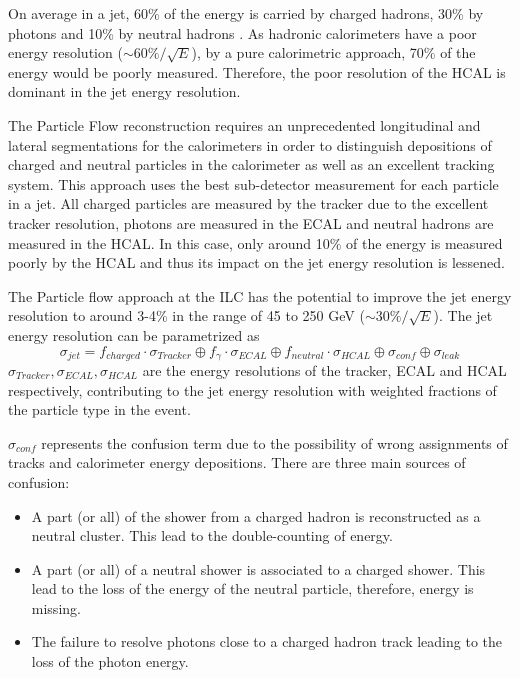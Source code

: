 On average in a jet, 60\% of the energy is carried by charged hadrons, 30\% by photons and 10\% by neutral hadrons \cite{Ebrahimi:394104}. As hadronic calorimeters have a poor energy resolution ($\sim 60\%/\sqrt{E}$), by a pure calorimetric approach, 70\% of the energy would be poorly measured. Therefore, the poor resolution of the HCAL is dominant in the jet energy resolution.

The Particle Flow reconstruction requires an unprecedented longitudinal and lateral segmentations for the calorimeters in order to distinguish depositions of charged and neutral particles in the calorimeter as well as an excellent tracking system. This approach uses the best sub-detector measurement for each particle in a jet. All charged particles are measured by the tracker due to the excellent tracker resolution, photons are measured in the ECAL and neutral hadrons are measured in the HCAL. In this case, only around 10\% of the energy is measured poorly by the HCAL and thus its impact on the jet energy resolution is lessened.

The Particle flow approach at the ILC has the potential to improve the jet energy resolution to around 3-4\% in the range of 45 to 250 GeV ($\sim 30\%/\sqrt{E}$). The jet energy resolution can be parametrized as
\begin{equation}
  \sigma_{jet} = f_{charged} \cdot \sigma_{Tracker} \oplus f_{\gamma} \cdot \sigma_{ECAL} \oplus f_{neutral} \cdot \sigma_{HCAL} \oplus \sigma_{conf} \oplus \sigma_{leak}
\end{equation}
$\sigma_{Tracker}, \sigma_{ECAL}, \sigma_{HCAL}$ are the energy resolutions of the tracker, ECAL and HCAL respectively, contributing to the jet energy resolution with weighted fractions of the particle type in the event.

$\sigma_{conf}$ represents the confusion term due to the possibility of wrong assignments of tracks and calorimeter energy depositions. There are three main sources of confusion:

\begin{itemize}
  \item A part (or all) of the shower from a charged hadron is reconstructed as a neutral cluster. This lead to the double-counting of energy.
  \item A part (or all) of a neutral shower is associated to a charged shower. This lead to the loss of the energy of the neutral particle, therefore, energy is missing.
  \item The failure to resolve photons close to a charged hadron track leading to the loss of the photon energy.
\end{itemize}

